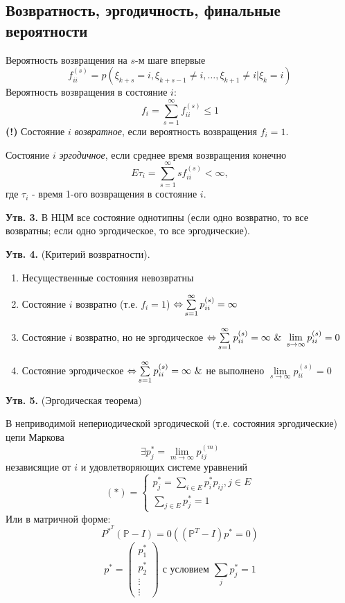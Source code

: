 \subsection{Возвратность, эргодичность, финальные вероятности}

\noindent Вероятность возвращения на $s$-м шаге впервые
\[ f_{ii}^{(s)} = p (\xi_{k + s} = i, \xi_{k+s-1} \ne i, \dots, \xi_{k+1} \ne i | \xi_k = i) \]
Вероятность возвращения в состояние $i$:
\[ f_i = \sum_{s=1}^{\infty} f_{ii}^{(s)} \le 1 \]
\textbf{(!)} Состояние $i$ \textit{возвратное}, если вероятность возвращения $f_i = 1$.

Состояние $i$ \textit{эргодичное}, если среднее время возвращения конечно
\[ E \tau_i = \sum_{s=1}^{\infty} s f_{ii}^{(s)} < \infty, \]
где $\tau_i$ - время 1-ого возвращения в состояние $i$.

\textbf{Утв. 3.} В НЦМ все состояние однотипны (если одно возвратно, то все возвратны; если одно эргодическое, то все эргодические).

\textbf{Утв. 4.} (Критерий возвратности).
\begin{enumerate}
	\item Несущественные состояния невозвратны
	\item Состояние $i$ возвратно (т.е. $f_i=1$) $\operatorname{\Leftrightarrow} \sum\limits_{s=1}^{\infty} p_{ii}^{(s)} = \infty$
	\item Состояние $i$ возвратно, но не эргодическое $\operatorname{\Leftrightarrow} \sum\limits_{s=1}^{\infty} p_{ii}^{(s)} = \infty ~ \& ~ \lim\limits_{s \to \infty} p_{ii}^{(s)} = 0$
	\item Состояние эргодическое $\operatorname{\Leftrightarrow} \sum\limits_{s=1}^{\infty} p_{ii}^{(s)} = \infty ~ \&$ не выполнено $\lim\limits_{s \to \infty} p_{ii}^{(s)} = 0$
\end{enumerate}

\textbf{Утв. 5.} (Эргодическая теорема)

\noindent В неприводимой непериодической эргодической (т.е. состояния эргодические) цепи Маркова
\[ \exists p_{j}^{*} = \lim_{m \to \infty} p_{ij}^{(m)} \]
независящие от $i$ и удовлетворяющих системе уравнений
\[
(*) =
\begin{cases}
	p_{j}^{*} = \sum\limits_{i \in E} p_{i}^{*} p_{ij}, j \in E \\
	\sum\limits_{j \in E} p_{j}^{*} = 1
\end{cases}
\]
Или в матричной форме:
\[
P^{*^T} (\mathbb{P} - I) = 0 ( (\mathbb{P}^T - I)p^* = 0 )
\]
\[
p^{*}=
\begin{pmatrix}
	p_1^* \\ p_2^* \\ \vdots \\ \vdots
\end{pmatrix}
\text{ с условием } \sum_j p_j^* = 1
\]


